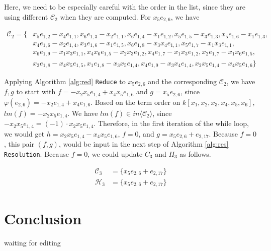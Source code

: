 \documentclass{article}
\theoremstyle{definition}
\theoremstyle{remark}
\theoremstyle{example}
\begin{document}
Here, we need to be especially careful with the order in the list, since they are using different $\mathcal{C}_2$ when they are computed. For $x_5e_{2,6}$, we have

\begin{equation}
    \begin{aligned}
        \mathcal{C}_2 = \{&x_5e_{1,2}-x_4e_{1,1},x_6e_{1,3}-x_2e_{1,1},x_6e_{1,4}-x_1e_{1,2},x_5e_{1,5}-x_3e_{1,3},x_5e_{1,6}-x_1e_{1,3},\\
        & x_4e_{1,6}-x_2e_{1,4},x_3e_{1,6}-x_1e_{1,5},x_6e_{1,8}-x_3x_4e_{1,1},x_5e_{1,7}-x_1x_3e_{1,1},\\
        & x_6e_{1,9}-x_1x_3e_{1,1},x_4x_6e_{1,5}-x_2x_3e_{1,2},x_4e_{1,7}-x_1x_3e_{1,2},x_2e_{1,7}-x_1x_6e_{1,5},\\
        & x_2e_{1,8}-x_4x_5e_{1,5},x_1e_{1,8}-x_3x_5e_{1,4},x_4e_{1,9}-x_3x_4e_{1,4},x_2x_5e_{1,4}-x_4x_5e_{1,6}\}
    \end{aligned}
\end{equation}

Applying Algorithm \ref{alg:red} \verb+Reduce+ to $x_5e_{2,6}$ and the corresponding $\mathcal{C}_2$, we have $f,g$ to start with $f = -x_2x_5e_{1,4} + x_4x_5e_{1,6}$ and $g = x_5e_{2,6}$, since $\varphi(e_{2,6}) = -x_2e_{1,4}+x_4e_{1,6}$. Based on the term order on $k[x_1,x_2,x_3,x_4,x_5,x_6]$, $lm(f) = -x_2x_5e_{1,4}$. We have $lm(f) \in in\langle \mathcal{C}_2\rangle$, since $-x_2x_5e_{1,4} = (-1) \cdot x_2x_5e_{1,4}$. Therefore, in the first iteration of the while loop, we would get $h = x_2x_5e_{1,4}-x_4x_5e_{1,6}$, $f = 0$, and $g = x_5e_{2,6}+e_{2,17}$. Because $f = 0$, this pair $(f,g)$, would be input in the next step of Algorithm \ref{alg:res} \verb+Resolution+. Because $f = 0$, we could update $C_3$ and $H_3$ as follows.

\begin{equation}
    \begin{aligned}
        \mathcal{C}_3 &= \{x_5e_{2,6}+e_{2,17}\}\\
        \mathcal{H}_3 &= \{x_5e_{2,6}+e_{2,17}\}
    \end{aligned}
\end{equation}
\section{Conclusion}

\paragraph{  }

\textcolor{BrickRed}{waiting for editing}

\newpage
\printbibliography
\end{document}
